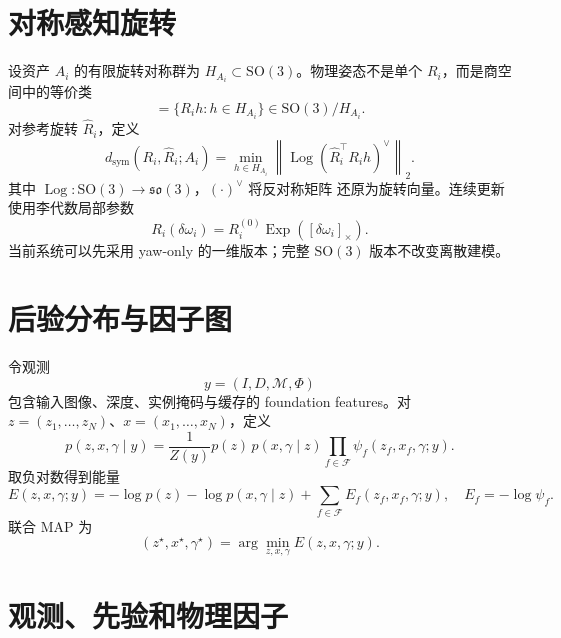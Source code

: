 \documentclass[11pt,a4paper]{ctexart}
\newcommand{\SO}{\mathrm{SO}}
\begin{document}
\section{对称感知旋转}
设资产 $A_i$ 的有限旋转对称群为 $H_{A_i}\subset\SO(3)$。物理姿态不是单个
$R_i$，而是商空间中的等价类
\begin{equation}
 [R_i]=\{R_i h:h\in H_{A_i}\}\in\SO(3)/H_{A_i}.
\end{equation}
对参考旋转 $\widehat R_i$，定义
\begin{equation}
 d_{\mathrm{sym}}(R_i,\widehat R_i;A_i)
 =\min_{h\in H_{A_i}}
 \left\|\operatorname{Log}\!\left(\widehat R_i^\top R_i h\right)^\vee
 \right\|_2 .
\end{equation}
其中 $\operatorname{Log}:\SO(3)\to\mathfrak{so}(3)$，$(\cdot)^\vee$ 将反对称矩阵
还原为旋转向量。连续更新使用李代数局部参数
\begin{equation}
 R_i(\delta\omega_i)=R_i^{(0)}
 \operatorname{Exp}([\delta\omega_i]_\times).
\end{equation}
当前系统可以先采用 yaw-only 的一维版本；完整 $\SO(3)$ 版本不改变离散建模。

\section{后验分布与因子图}
令观测
\begin{equation}
 y=(I,D,\mathcal M,\Phi)
\end{equation}
包含输入图像、深度、实例掩码与缓存的 foundation features。对
$z=(z_1,\ldots,z_N)$、$x=(x_1,\ldots,x_N)$，定义
\begin{equation}
 p(z,x,\gamma\mid y)
 =\frac{1}{Z(y)}p(z)\,p(x,\gamma\mid z)
 \prod_{f\in\mathcal F}\psi_f(z_f,x_f,\gamma;y).
\end{equation}
取负对数得到能量
\begin{equation}
 E(z,x,\gamma;y)
 =-\log p(z)-\log p(x,\gamma\mid z)
 +\sum_{f\in\mathcal F}E_f(z_f,x_f,\gamma;y),
 \quad E_f=-\log\psi_f .
\end{equation}
联合 MAP 为
\begin{equation}
 (z^\star,x^\star,\gamma^\star)
 =\arg\min_{z,x,\gamma}E(z,x,\gamma;y).
\end{equation}

\section{观测、先验和物理因子}
\end{document}
